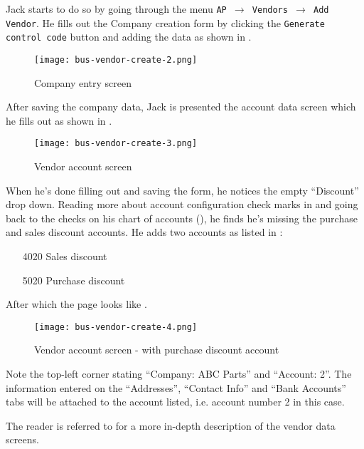 Jack starts to do so by going through the menu {\tt AP $\rightarrow$ Vendors $\rightarrow$
Add Vendor}. He fills out the Company creation form by clicking the {\tt Generate control code}
button and adding the data as shown in .

\begin{figure}[h]
\centering
\texttt{[image: bus-vendor-create-2.png]}
\caption{Company entry screen}
\label{fig:vendor-create-1}
\end{figure}

After saving the company data, Jack is presented the account data screen which he fills out
as shown in .

\begin{figure}[h]
\centering
\texttt{[image: bus-vendor-create-3.png]}
\caption{Vendor account screen}
\label{fig:vendor-create-2}
\end{figure}

When he's done filling out and saving the form,
he notices the empty ``Discount'' drop down. Reading more about account configuration
check marks in  and going back to the checks on his
chart of accounts (), he finds he's missing the purchase and
sales discount accounts. He adds two accounts as listed in :

\begin{itemize}
\item [4020] Sales discount
\item [5020] Purchase discount
\end{itemize}

After which the page looks like .

\begin{figure}[h]
\centering
\texttt{[image: bus-vendor-create-4.png]}
\caption{Vendor account screen - with purchase discount account}
\label{fig:vendor-create-3}
\end{figure}

Note the top-left corner stating ``Company: ABC Parts'' and ``Account: 2''. The information
entered on the ``Addresses'', ``Contact Info'' and ``Bank Accounts'' tabs will be attached
to the account listed, i.e. account number 2 in this case.

The reader is referred to  for a more in-depth
description of the vendor data screens.

